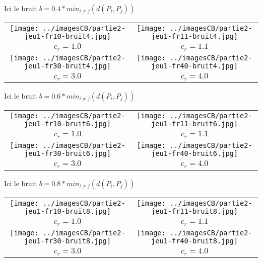 \documentclass[11pt,a4paper]{article}
\begin{document}
\pagebreak

Ici le bruit $b=0.4*min_{i \neq j}(d(P_i,P_j))$
\begin{center}
\begin{tabular}{|c|c|}
\hline
\texttt{[image: ../imagesCB/partie2-jeu1-fr10-bruit4.jpg]} & \texttt{[image: ../imagesCB/partie2-jeu1-fr11-bruit4.jpg]} \\
$c_r=1.0$                                                             & $c_r=1.1$ \\
\hline
\texttt{[image: ../imagesCB/partie2-jeu1-fr30-bruit4.jpg]} & \texttt{[image: ../imagesCB/partie2-jeu1-fr40-bruit4.jpg]} \\
$c_r=3.0$                                                             & $c_r=4.0$ \\
\hline
\end{tabular}
\end{center}

\pagebreak

Ici le bruit $b=0.6*min_{i \neq j}(d(P_i,P_j))$
\begin{center}
\begin{tabular}{|c|c|}
\hline
\texttt{[image: ../imagesCB/partie2-jeu1-fr10-bruit6.jpg]} & \texttt{[image: ../imagesCB/partie2-jeu1-fr11-bruit6.jpg]} \\
$c_r=1.0$                                                             & $c_r=1.1$ \\
\hline
\texttt{[image: ../imagesCB/partie2-jeu1-fr30-bruit6.jpg]} & \texttt{[image: ../imagesCB/partie2-jeu1-fr40-bruit6.jpg]} \\
$c_r=3.0$                                                             & $c_r=4.0$ \\
\hline
\end{tabular}
\end{center}

\pagebreak

Ici le bruit $b=0.8*min_{i \neq j}(d(P_i,P_j))$
\begin{center}
\begin{tabular}{|c|c|}
\hline
\texttt{[image: ../imagesCB/partie2-jeu1-fr10-bruit8.jpg]} & \texttt{[image: ../imagesCB/partie2-jeu1-fr11-bruit8.jpg]} \\
$c_r=1.0$                                                             & $c_r=1.1$ \\
\hline
\texttt{[image: ../imagesCB/partie2-jeu1-fr30-bruit8.jpg]} & \texttt{[image: ../imagesCB/partie2-jeu1-fr40-bruit8.jpg]} \\
$c_r=3.0$                                                             & $c_r=4.0$ \\
\hline
\end{tabular}
\end{center}
\end{document}
